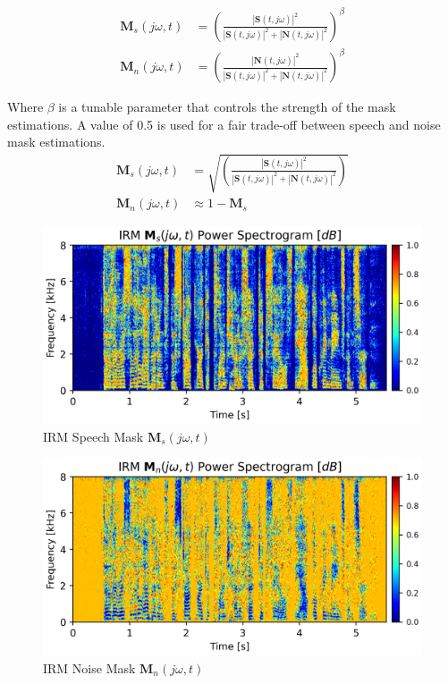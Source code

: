 \begin{align}
    \label{eq:irm_speech}\mathbf{M}_{s}(j\omega, t) & = {\left( \frac{|\mathbf{S}(t,j\omega)|^2}{|\mathbf{S}(t,j\omega)|^2 + |\mathbf{N}(t,j\omega)|^2} \right)}^{\beta} \\
    \label{eq:irm_noise}\mathbf{M}_{n}(j\omega, t) & = {\left( \frac{|\mathbf{N}(t,j\omega)|^2}{|\mathbf{S}(t,j\omega)|^2 + |\mathbf{N}(t,j\omega)|^2} \right)}^{\beta}
\end{align}
 
Where \(\beta \) is a tunable parameter that 
controls the strength of the mask estimations. 
A value of 0.5 is used 
for a fair trade-off between speech and noise mask estimations.
%
\begin{align}
    \mathbf{M}_{s}(j\omega, t) & = \sqrt{\left( \frac{|\mathbf{S}(t,j\omega)|^2}{|\mathbf{S}(t,j\omega)|^2 + |\mathbf{N}(t,j\omega)|^2} \right)} \\
    \mathbf{M}_{n}(j\omega, t) & \approx 1 - \mathbf{M}_{s}
\end{align}

\begin{figure}[H]
    \centering
    \includegraphics[width=\linewidth]{Features/images/irm_mask}
    \caption{IRM Speech Mask \(\mathbf{M}_{s}(j\omega, t)\)}\label{fig:irm_mask}
\end{figure}
\begin{figure}[H]
    \centering
    \includegraphics[width=\linewidth]{Features/images/irm_mask_noise}
    \caption{IRM Noise Mask \(\mathbf{M}_{n}(j\omega, t)\)}\label{fig:irm_mask_noise}
\end{figure}

